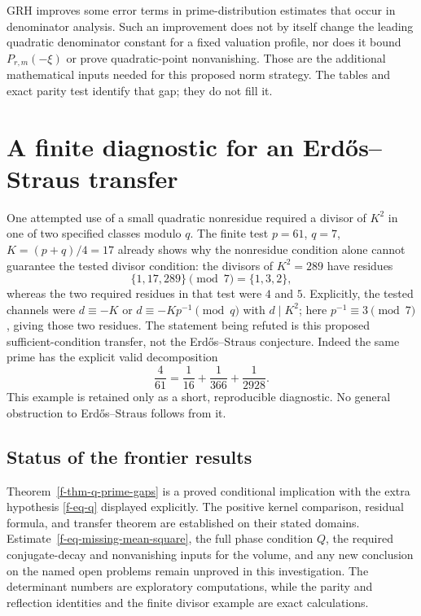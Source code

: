 \documentclass[11pt,a4paper]{article}
\theoremstyle{definition}
\theoremstyle{remark}
\begin{document}
GRH improves some error terms in prime-distribution estimates that occur
in denominator analysis.  Such an improvement does not by itself change
the leading quadratic denominator constant for a fixed valuation profile,
nor does it bound $P_{r,m}(-\xi)$ or prove quadratic-point nonvanishing.
Those are the additional mathematical inputs needed for this proposed
norm strategy.  The tables and exact parity test identify that gap; they
do not fill it.

\section{A finite diagnostic for an Erd\H{o}s--Straus transfer}
\label{f-sec-es-diagnostic}

One attempted use of a small quadratic nonresidue required a divisor of
$K^2$ in one of two specified classes modulo $q$.  The finite test
$p=61$, $q=7$, $K=(p+q)/4=17$ already shows why the nonresidue condition
alone cannot guarantee the tested divisor condition: the divisors of
$K^2=289$ have residues
\[
 \{1,17,289\}\pmod7=\{1,3,2\},
\]
whereas the two required residues in that test were $4$ and $5$.
Explicitly, the tested channels were
$d\equiv-K$ or $d\equiv-Kp^{-1}\pmod q$ with $d\mid K^2$;
here $p^{-1}\equiv3\pmod7$, giving those two residues.
The statement being refuted is this proposed sufficient-condition
transfer, not the Erd\H{o}s--Straus conjecture.  Indeed the same prime has
the explicit valid decomposition
\[
 \frac4{61}=\frac1{16}+\frac1{366}+\frac1{2928}.
\]
This example is retained only as a short, reproducible diagnostic.  No
general obstruction to Erd\H{o}s--Straus follows from it.

\subsection*{Status of the frontier results}

Theorem~\ref{f-thm-q-prime-gaps} is a proved conditional implication with
the extra hypothesis \eqref{f-eq-q} displayed explicitly.  The positive
kernel comparison, residual formula, and transfer theorem are established
on their stated domains.  Estimate~\eqref{f-eq-missing-mean-square}, the
full phase condition $Q$, the required conjugate-decay and nonvanishing
inputs for the volume, and any new conclusion on the named open problems
remain unproved in this investigation.  The determinant numbers are
exploratory computations, while the parity and reflection identities and
the finite divisor example are exact calculations.
\end{document}
